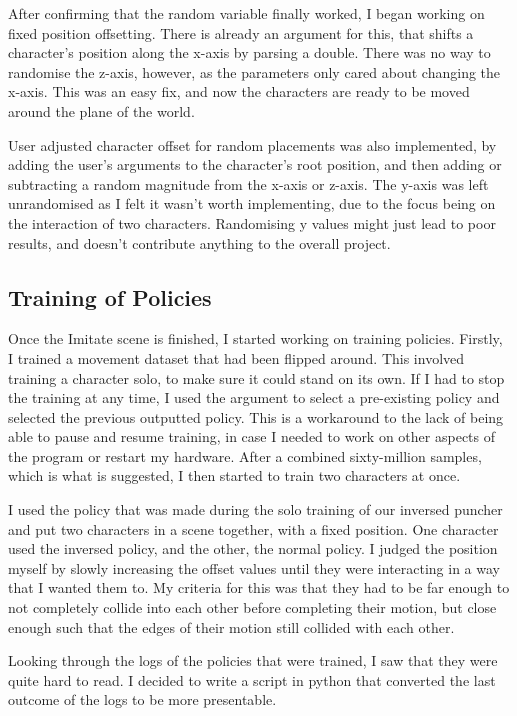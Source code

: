 \documentclass{l4proj}
\begin{document}
After confirming that the random variable finally worked, I began working on fixed position offsetting. There is already an argument for this, that shifts a character's position along the x-axis by parsing a double. There was no way to randomise the z-axis, however, as the parameters only cared about changing the x-axis. This was an easy fix, and now the characters are ready to be moved around the plane of the world.

User adjusted character offset for random placements was also implemented, by adding the user's arguments to the character's root position, and then adding or subtracting a random magnitude from the x-axis or z-axis. The y-axis was left unrandomised as I felt it wasn't worth implementing, due to the focus being on the interaction of two characters. Randomising y values might just lead to poor results, and doesn't contribute anything to the overall project.

\subsection{Training of Policies}
Once the Imitate scene is finished, I started working on training policies. Firstly, I trained a movement dataset that had been flipped around. This involved training a character solo, to make sure it could stand on its own. If I had to stop the training at any time, I used the argument to select a pre-existing policy and selected the previous outputted policy. This is a workaround to the lack of being able to pause and resume training, in case I needed to work on other aspects of the program or restart my hardware. After a combined sixty-million samples, which is what is suggested, I then started to train two characters at once.

I used the policy that was made during the solo training of our inversed puncher and put two characters in a scene together, with a fixed position. One character used the inversed policy, and the other, the normal policy. I judged the position myself by slowly increasing the offset values until they were interacting in a way that I wanted them to. My criteria for this was that they had to be far enough to not completely collide into each other before completing their motion, but close enough such that the edges of their motion still collided with each other.

Looking through the logs of the policies that were trained, I saw that they were quite hard to read. I decided to write a script in python that converted the last outcome of the logs to be more presentable.
\end{document}
